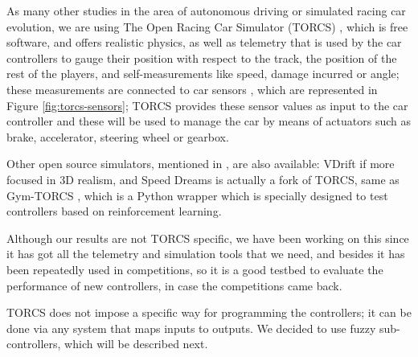 \documentclass[10pt,journal,compsoc]{IEEEtran}
\begin{document}
As many other studies in the area of autonomous driving or simulated
racing car evolution, we are using The Open Racing Car Simulator
(TORCS) \cite{torcs4}, which is free software, and offers realistic
physics, as well as telemetry that is used by the car controllers to
gauge their position with respect to the track, the position of the
rest of the players, and self-measurements like speed, damage incurred
or angle; these measurements are connected to car sensors \cite{torcs5}, which are represented in Figure \ref{fig:torcs-sensors}; TORCS provides
these sensor values as input to the car controller and these will be
used to manage the car by means of actuators such as brake,
accelerator, steering wheel or gearbox. 


Other open source simulators, mentioned in \cite{Loiacono:2012:LEA:2212908.2212953}, are also available: VDrift
if more focused in 3D realism, and Speed Dreams is actually a fork of
TORCS, same as Gym-TORCS \cite{yoshida2016gym}, which is a Python
wrapper which is specially designed to test controllers based on
reinforcement learning.

Although our results are not TORCS specific, we have been
working on this since it has got all the telemetry and simulation
tools that we need, and besides it has been repeatedly used in
competitions, so it is a good testbed to evaluate the performance of new controllers, in case the competitions came back.

TORCS does not impose a specific way for programming the controllers;
it can be done via any system that maps inputs to outputs. We decided
to use fuzzy sub-controllers, which will be described next.

\end{document}

